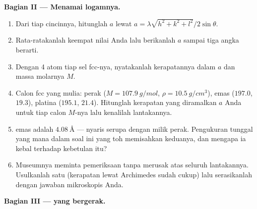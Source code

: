 \begin{problem}
\medskip\noindent\textbf{Bagian II --- Menamai logamnya.}

\begin{enumerate}[resume]
  \item Dari tiap cincinnya, hitunglah  $a$ lewat
        $a = \lambda\sqrt{h^2+k^2+l^2}/2\sin\theta$.
  \item Rata-ratakanlah keempat nilai Anda lalu berikanlah $a$ sampai tiga
        angka berarti.
  \item Dengan 4 atom tiap sel fcc-nya, nyatakanlah kerapatannya dalam
        $a$ dan massa molarnya $M$.
  \item Calon fcc yang mulia: perak
        ($M = \qty{107.9}{g/mol}$, $\rho = \qty{10.5}{g/cm^3}$),
        emas ($197.0$, $19.3$), platina ($195.1$, $21.4$).
        Hitunglah kerapatan yang diramalkan $a$ Anda untuk tiap calon
        $M$-nya lalu kenalilah lantakannya.
  \item {} emas adalah $\qty{4.08}{\angstrom}$ ---
        nyaris serupa dengan milik perak. Pengukuran tunggal yang mana dalam
        soal ini yang toh memisahkan keduanya, dan mengapa ia kebal
        terhadap kebetulan itu?
  \item Museumnya meminta pemeriksaan tanpa merusak atas seluruh
        lantakannya. Usulkanlah satu (kerapatan lewat Archimedes sudah cukup)
        lalu serasikanlah dengan jawaban mikroskopis Anda.
\end{enumerate}

\medskip\noindent\textbf{Bagian III ---  yang bergerak.}


\end{problem}
